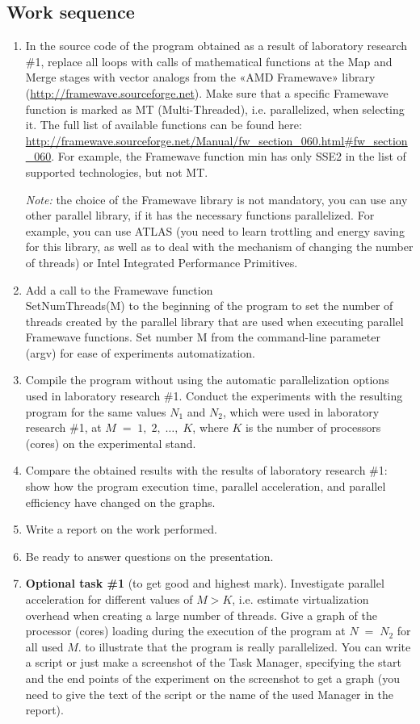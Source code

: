 { %
	\subsection{Work sequence}
	\begin{enumerate}
		\item In the source code of the program obtained as a result of laboratory research \#1, replace all loops with calls of mathematical functions at the Map and Merge stages with vector analogs from the «AMD Framewave» library (\url{http://framewave.sourceforge.net}). Make sure that a specific Framewave function is marked as MT (Multi-Threaded), i.e. parallelized, when selecting it. The full list of available functions can be found here: \\\url{http://framewave.sourceforge.net/Manual/fw_section_060.html#fw_section_060}. For example, the Framewave function min has only SSE2 in the list of supported technologies, but not MT. 
			\par\textit{Note:} the choice of the Framewave library is not mandatory, you can use any other parallel library, if it has the necessary functions parallelized. For example, you can use ATLAS (you need to learn trottling and energy saving for this library, as well as to deal with the mechanism of changing the number of threads) or Intel Integrated Performance Primitives.
		\item Add a call to the Framewave function \\SetNumThreads(M) to the beginning of the program to set the number of threads created by the parallel library that are used when executing parallel Framewave functions. Set number M from the command-line parameter (argv) for ease of experiments automatization.
		\item Compile the program without using the automatic parallelization options used in laboratory research \#1. Conduct the experiments with the resulting program for the same values $N_1$ and $N_2$, which were used in laboratory research \#1, at $M\;=\;1,\;2,\;…,\;K$, where $K$ is the number of processors (cores) on the experimental stand.
		\item Compare the obtained results with the results of laboratory research \#1: show how the program execution time, parallel acceleration, and parallel efficiency have changed on the graphs.
		\item Write a report on the work performed.
		\item Be ready to answer questions on the presentation.
		\item\textbf{Optional task \#1} (to get good and highest mark). Investigate parallel acceleration for different values of $M > K$, i.e. estimate virtualization overhead when creating a large number of threads. Give a graph of the processor (cores) loading during the execution of the program at $N\;=\;N_2$ for all used $M$. to illustrate that the program is really parallelized. You can write a script or just make a screenshot of the Task Manager, specifying the start and the end points of the experiment on the screenshot to get a graph (you need to give the text of the script or the name of the used Manager in the report).

\end{enumerate}}
